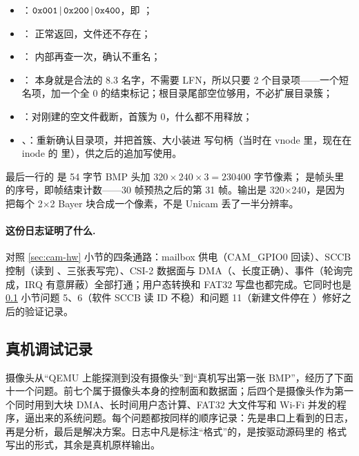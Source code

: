\begin{itemize}
  \item {}：$\code{0x001}\,|\,\code{0x200}\,|\,\code{0x400}$，即 ；
  \item {}： 正常返回，文件还不存在；
  \item {}： 内部再查一次，确认不重名；
  \item {}： 本身就是合法的 8.3 名字，不需要 LFN，所以只要 2 个目录项——一个短名项，加一个全 0 的结束标记；根目录尾部空位够用，不必扩展目录簇；
  \item {}：对刚建的空文件截断，首簇为 0，什么都不用释放；
  \item {}、：重新确认目录项，并把首簇、大小装进  写句柄（当时在 vnode 里，现在在 inode 的  里），供之后的追加写使用。
\end{itemize}

最后一行的  是 54 字节 BMP 头加 $320\times240\times3=230400$ 字节像素； 是帧头里的序号，即帧结束计数——30 帧预热之后的第 31 帧。输出是 320$\times$240，是因为  把每个 2$\times$2 Bayer 块合成一个像素，不是 Unicam 丢了一半分辨率。

\paragraph{这份日志证明了什么.} 对照 \ref{sec:cam-hw} 小节的四条通路：mailbox 供电（CAM\_GPIO0 回读）、SCCB 控制（读到 、三张表写完）、CSI-2 数据面与 DMA（、长度正确）、事件（轮询完成，IRQ 有意屏蔽）全部打通；用户态转换和 FAT32 写盘也都完成。它同时也是 \ref{sec:cam-bugs} 小节问题 5、6（软件 SCCB 读 ID 不稳）和问题 11（新建文件停在 ）修好之后的验证记录。

\subsection{真机调试记录}
\label{sec:cam-bugs}

摄像头从“QEMU 上能探测到没有摄像头”到“真机写出第一张 BMP”，经历了下面十一个问题。前七个属于摄像头本身的控制面和数据面；后四个是摄像头作为第一个同时用到大块 DMA、长时间用户态计算、FAT32 大文件写和 Wi-Fi 并发的程序，逼出来的系统问题。每个问题都按同样的顺序记录：先是串口上看到的日志，再是分析，最后是解决方案。日志中凡是标注“格式”的，是按驱动源码里的  格式写出的形式，其余是真机原样输出。

